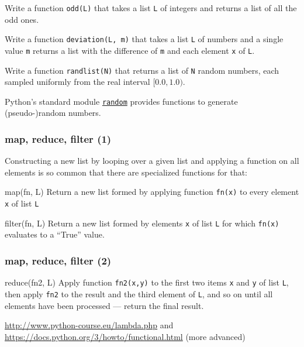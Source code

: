 \documentclass[english,serif,mathserif,xcolor=pdftex,dvipsnames,table]{beamer}
\begin{document}
\begin{frame}[fragile]
  \begin{exercise*}[3.C]
    Write a function \texttt{odd(L)} that takes a list \texttt{L} of
    integers and returns a list of all the odd ones.
  \end{exercise*}

  \+
  \begin{exercise*}[3.D]
    Write a function \texttt{deviation(L, m)} that takes a list \texttt{L} of
    numbers and a single value \texttt{m} returns a list with the difference of
    \texttt{m} and each element \texttt{x} of \texttt{L}.
  \end{exercise*}

  \+
  \begin{exercise*}[3.E]
    Write a function \texttt{randlist(N)} that returns a list of
    \texttt{N} random numbers, each sampled uniformly from the real
    interval $[0.0, 1.0)$.

    \+
    Python's standard module
    \href{https://docs.python.org/3/library/random.html}{\texttt{random}}
    provides functions to generate (pseudo-)random numbers.
  \end{exercise*}
\end{frame}


\begin{frame}
  \frametitle{map, reduce, filter (1)}

  Constructing a new list by looping over a given list and applying a function
  on all elements is so common that there are specialized functions for that:

  \begin{describe}{map(fn, L)}
    Return a new list formed by applying function \texttt{fn(x)} to every
    element \texttt{x} of list \texttt{L}
  \end{describe}

  \+
  \begin{describe}{filter(fn, L)}
    Return a new list formed by elements \texttt{x} of list \texttt{L} for which
    \texttt{fn(x)} evaluates to a ``True'' value.
  \end{describe}
\end{frame}

\begin{frame}
  \frametitle{map, reduce, filter (2)}

  \begin{describe}{reduce(fn2, L)}
    Apply function \texttt{fn2(x,y)} to the first two items \texttt{x} and
    \texttt{y} of list \texttt{L}, then apply \texttt{fn2} to the result and the
    third element of \texttt{L}, and so on until all elements have been
    processed --- return the final result.
  \end{describe}

  \+
  \begin{seealso}
    \url{http://www.python-course.eu/lambda.php}
    and \url{https://docs.python.org/3/howto/functional.html} (more advanced)
  \end{seealso}
\end{frame}
\end{document}
